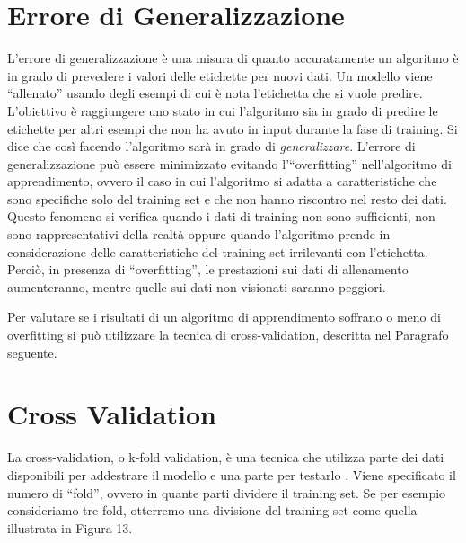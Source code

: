 \documentclass[12pt,italian]{report}
\begin{document}
\section{Errore di Generalizzazione}
\label{sec:errore}
L'errore di generalizzazione è una misura di quanto accuratamente un algoritmo è in grado di prevedere i valori delle etichette per nuovi dati.
Un modello viene ``allenato'' usando degli esempi di cui è nota l'etichetta che si vuole predire. L'obiettivo è raggiungere uno stato in cui l'algoritmo sia in grado di predire le etichette per altri esempi che non ha avuto in input durante la fase di training. Si dice che così facendo l'algoritmo sarà in grado di \emph{generalizzare}.
L'errore di generalizzazione può essere  minimizzato evitando l'``overfitting'' nell'algoritmo di apprendimento, ovvero il caso in cui l'algoritmo si adatta a caratteristiche che sono specifiche solo del training set e che non hanno riscontro nel resto dei dati. Questo fenomeno si verifica quando i dati di training non sono sufficienti, non sono rappresentativi della realtà oppure quando l'algoritmo prende in considerazione delle caratteristiche del training set irrilevanti con l'etichetta.  Perciò, in presenza di ``overfitting'', le prestazioni sui dati di allenamento aumenteranno, mentre quelle sui dati non visionati saranno peggiori. 

Per valutare se i risultati di un algoritmo di apprendimento soffrano o meno di overfitting si può utilizzare la tecnica di cross-validation, descritta nel Paragrafo seguente.
\section{Cross Validation}
\label{cv}
La cross-validation, o k-fold validation, è una tecnica che utilizza parte dei dati disponibili per addestrare il modello e una parte per testarlo \cite{TheElementsofStatisticalLearning}. Viene specificato il numero di ``fold'', ovvero in quante parti dividere il training set. Se per esempio consideriamo tre fold, otterremo una divisione del training set come quella illustrata in Figura 13.
\end{document}
